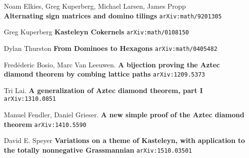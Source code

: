 \documentclass[12pt]{article}
\begin{document}
\selectfont \fontsize{12}{10}\selectfont

\begin{thebibliography}{}

\item Noam Elkies, Greg Kuperberg, Michael Larsen, James Propp  \\ \textbf{Alternating sign matrices and domino tilings} \texttt{arXiv:math/9201305}

\item Greg Kuperberg \textbf{Kasteleyn Cokernels} \texttt{arXiv:math/0108150}

\item Dylan Thurston \textbf{From Dominoes to Hexagons} \texttt{arXiv:math/0405482}

\item Fred\'{e}deric Bosio, Marc Van Leeuwen. \textbf{A bijection proving the Aztec diamond theorem by combing lattice paths} \texttt{arXiv:1209.5373}

\item Tri Lai. \textbf{A generalization of Aztec diamond theorem, part I} \texttt{arXiv:1310.0851}

\item Manuel Fendler, Daniel Grieser. \textbf{A new simple proof of the Aztec diamond theorem} \texttt{arXiv:1410.5590}

\item David E. Speyer \textbf{Variations on a theme of Kasteleyn, with application to the totally nonnegative Grassmannian} \texttt{arXiv:1510.03501}

\end{thebibliography}

\selectfont \fontsize{20}{25}\selectfont
\end{document}
